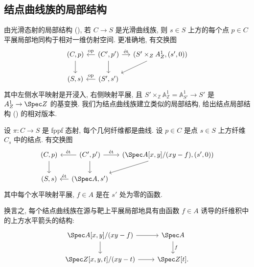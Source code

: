 \subsection{结点曲线族的局部结构}\label{src:6.2.6-subsection}
由光滑态射的局部结构 (), 若 $C\to\allowbreak S$ 是光滑曲线族, 则 $s\in S$ 上方的每个点 $p\in C$ 平展局部地同构于相对一维仿射空间. 更准确地, 有交换图
\[
\begin{tikzcd}[column sep=small]
(C,p)\arrow[d]&(C',p')\arrow[l,"\mathrm{op}"']\arrow[r,"\text{ét}"]\arrow[d]&(S'\times_{\mathbb Z}\mathbb A^1_{\mathbb Z},(s',0))\arrow[dl]\\
(S,s)&(S',s')\arrow[l,"\mathrm{op}"']&
\end{tikzcd}
\]
其中左侧水平映射是开浸入, 右侧映射平展, 且 $S'\times_{\mathbb Z}\mathbb A^1_{\mathbb Z}=\mathbb A^1_{S'}\to\allowbreak S'$ 是 $\mathbb A^1_{\mathbb Z}\to\Spec\mathbb Z$ 的基变换. 我们为结点曲线族建立类似的局部结构, 给出结点局部结构 () 的相对版本.
\begin{theorem}[结点曲线族的局部结构]\label{src:6.2.26}
设 $\pi:C\to\allowbreak S$ 是 fppf 态射, 每个几何纤维都是曲线. 设 $p\in C$ 是点 $s\in S$ 上方纤维 $C_s$ 中的结点. 有交换图
\begin{equation}\label{src:6.2.27}
\begin{tikzcd}[column sep=small]
(C,p)\arrow[d]&(C',p')\arrow[l,"\text{ét}"']\arrow[r,"\text{ét}"]\arrow[d]&(\Spec A[x,y]/(xy-f),(s',0))\arrow[dl]\\
(S,s)&(\Spec A,s')\arrow[l,"\text{ét}"']&
\end{tikzcd}
\end{equation}
其中每个水平映射平展, $f\in A$ 是在 $s'$ 处为零的函数.
\end{theorem}
\newpage
\begin{remark}\label{src:6.2.28}
换言之, 每个结点曲线族在源与靶上平展局部地具有由函数 $f\in A$ 诱导的纤维积中的上方水平箭头的结构:
\[
\begin{tikzcd}
\Spec A[x,y]/(xy-f)\arrow[r]\arrow[d]&\Spec A\arrow[d,"f"]\\
\Spec\mathbb Z[x,y,t]/(xy-t)\arrow[r]&\Spec\mathbb Z[t].
\end{tikzcd}
\]
\end{remark}
